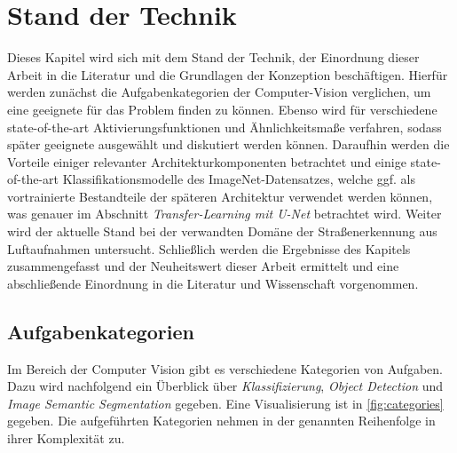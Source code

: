 
\chapter{Stand der Technik}

Dieses Kapitel wird sich mit dem Stand der Technik, der Einordnung dieser Arbeit in die Literatur 
und die Grundlagen der Konzeption beschäftigen. Hierfür werden zunächst 
die Aufgabenkategorien der Computer-Vision verglichen, um eine geeignete für das Problem finden zu können.
Ebenso wird für verschiedene state-of-the-art Aktivierungsfunktionen und Ähnlichkeitsmaße verfahren, 
sodass später geeignete ausgewählt und diskutiert werden können. Daraufhin werden 
die Vorteile einiger relevanter Architekturkomponenten betrachtet und einige 
state-of-the-art Klassifikationsmodelle des ImageNet-Datensatzes, welche ggf. 
als vortrainierte Bestandteile der späteren Architektur verwendet werden können, 
was genauer im Abschnitt \textit{Transfer-Learning mit U-Net} betrachtet wird. 
Weiter wird der aktuelle Stand bei der verwandten Domäne der Straßenerkennung 
aus Luftaufnahmen untersucht. Schließlich werden die Ergebnisse des Kapitels 
zusammengefasst und der Neuheitswert dieser Arbeit ermittelt und eine abschließende 
Einordnung in die Literatur und Wissenschaft vorgenommen.

\section{Aufgabenkategorien} \label{sec:aufgabenkategorien}

Im Bereich der Computer Vision gibt es verschiedene Kategorien von Aufgaben.
Dazu wird nachfolgend ein Überblick über \textit{Klassifizierung}, \textit{Object Detection} und \textit{Image Semantic Segmentation} gegeben.
Eine Visualisierung ist in \autoref{fig:categories} gegeben.
Die aufgeführten Kategorien nehmen in der genannten Reihenfolge in ihrer Komplexität zu.

